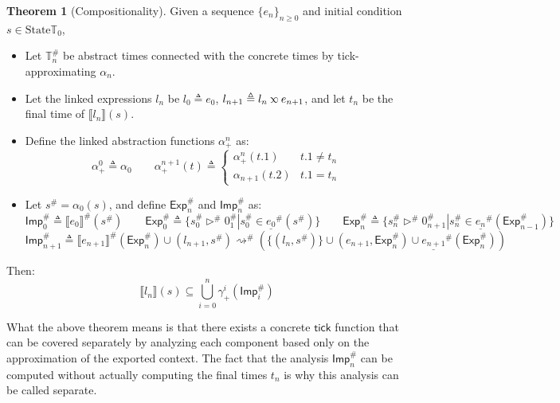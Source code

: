 \documentclass[acmsmall,review]{acmart}\settopmatter{printfolios=true,printccs=false,printacmref=false}
\theoremstyle{definition}
\newtheorem{thm}{Theorem}[section]
\newcommand*{\A}[1]{{#1}^{\#}}
\newcommand*{\Time}{\mathbb{T}}
\newcommand*{\ATime}{\A{\Time}}
\newcommand*{\State}{\text{State}}
\newcommand*{\semlink}{\mathbin{\rotatebox[origin=c]{180}{$\propto$}}}
\newcommand*{\link}[2]{{#1}\semlink{#2}}
\newcommand*{\Exp}{\mathsf{Exp}}
\newcommand*{\Imp}{\mathsf{Imp}}
\newcommand*{\sembracket}[1]{\lBrack{#1}\rBrack}
\newcommand*{\tick}{\mathsf{tick}}
\begin{document}
\begin{thm}[Compositionality]
  Given a sequence $\{e_n\}_{n\ge 0}$ and initial condition $s\in\State{\Time_0}$,

  \begin{itemize}
    \item Let $\ATime_n$ be abstract times connected with the concrete times by tick-approximating $\alpha_n$.
    \item Let the linked expressions $l_n$ be $l_0\triangleq e_0$, $l_{n+1}\triangleq\link{l_n}{e_{n+1}}$, and let $t_n$ be the final time of $\sembracket{l_n}(s)$.
    \item Define the linked abstraction functions $\alpha^{n}_+$ as:
          \[
            \alpha^0_+\triangleq\alpha_0
            \qquad
            \alpha^{n+1}_+(t)\triangleq
            \begin{cases}
              \alpha^n_+(t.1)   & t.1\neq t_n \\
              \alpha_{n+1}(t.2) & t.1=t_n
            \end{cases}
          \]
    \item Let $\A{s}=\alpha_0(s)$, and define $\A\Exp_n$ and $\A\Imp_n$ as:
          \[
            \A\Imp_0\triangleq\A{\sembracket{e_0}}(\A{s})\qquad
            \A\Exp_0\triangleq\{\A{s}_0\A\rhd\A{0}_1|\A{s}_0\in\A{\underline{e_0}}(\A{s})\}\qquad
            \A\Exp_{n}\triangleq\{\A{s}_n\A\rhd\A{0}_{n+1}|\A{s}_{n}\in\A{\underline{e_{n}}}(\A\Exp_{n-1})\}
          \]
          \[
            \A\Imp_{n+1}\triangleq\A{\sembracket{e_{n+1}}}(\A\Exp_n)\cup(l_{n+1},\A{s})\A\rightsquigarrow(\{(l_n,\A{s})\}\cup(e_{n+1},\A\Exp_n)\cup\A{\underline{e_{n+1}}}(\A\Exp_{n}))
          \]
  \end{itemize}

  Then:
  \[
    \sembracket{l_n}(s)\subseteq\bigcup_{i=0}^{n}{\gamma^i_+(\A\Imp_i)}
  \]
\end{thm}

What the above theorem means is that there exists a concrete $\tick$ function that can be covered separately by analyzing each component based only on the approximation of the exported context.
The fact that the analysis $\A\Imp_n$ can be computed without actually computing the final times $t_n$ is why this analysis can be called separate.


\end{document}
